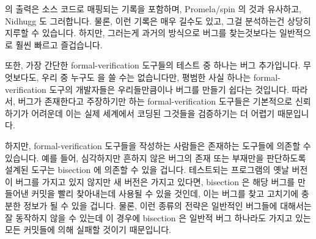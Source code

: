  의 출력은 소스 코드로 매핑되는 기록을 포함하며, Promela/spin 의 것과
유사하고, Nidhugg 도 그러합니다.
물론, 이런 기록은 매우 길수도 있고, 그걸 분석하는건 상당히 지루할 수 있습니다.
하지만, 그러는게 과거의 방식으로 버그를 찾는것보다는 일반적으로 훨씬 빠르고
즐겁습니다.
\iffalse

Any software artifact of any size contains bugs.
Therefore, a formal-verification tool that reports only the
presence or absence of bugs is not particularly useful.
What is needed is a tool that gives at least \emph{some} information
as to where the bug is located and the nature of that bug.

The \co{cbmc} output includes a traceback mapping back to the source
code, similar to Promela/spin's, as does Nidhugg.
Of course, these tracebacks can be quite long, and analyzing them
can be quite tedious.
However, doing so is usually quite a bit faster
and more pleasant than locating bugs the old-fashioned way.
\fi

또한, 가장 간단한 formal-verification 도구들의 테스트 중 하나는 버그
추가입니다.
무엇보다도, 우리 중 누구도  을 쓸 수는 없습니다만,
평범한 사실 하나는 formal-verification 도구의 개발자들은 우리들만큼이나 버그를
만들기 쉽다는 것입니다.
따라서, 버그가 존재한다고 주장하기만 하는 formal-verification 도구들은
기본적으로 신뢰하기가 어려운데 이는 실제 세계에서 코딩된 그것들을 검증하기는 더
어렵기 때문입니다.
\iffalse

In addition, one of the simplest tests of formal-verification tools is
bug injection.
After all, not only could any of us write
\co{printf("VERIFIED\\n")}, but the plain fact is that
developers of formal-verification tools are just as bug-prone as
are the rest of us.
Therefore, formal-verification tools that just proclaim that a
bug exists are fundamentally less trustworthy because it is
more difficult to verify them on real-world code.
\fi

하지만, formal-verification 도구들을 작성하는 사람들은 존재하는 도구들에 의존할
수 있습니다.
예를 들어, 심각하지만 흔하지 않은 버그의 존재 또는 부재만을 판단하도록 설계된
도구는 bisection 에 의존할 수 있을 겁니다.
테스트되는 프로그램의 옛날 버전이 버그를 가지고 있지 않지만 새 버전은 가지고
있다면, bisection 은 해당 버그를 만들어낸 커밋을 빨리 찾아내는데 사용될 수 있을
것인데, 이는 버그를 찾고 고치기에 충분한 정보가 될 수 있을 겁니다.
물론, 이런 종류의 전략은 일반적인 버그들에 대해서는 잘 동작하지 않을 수 있는데
이 경우에 bisection 은 일반적 버그 하나라도 가지고 있는 모든 커밋들에 의해
실패할 것이기 때문입니다.

